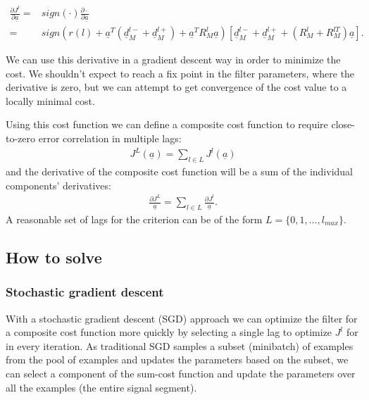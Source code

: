 \documentclass[journal,onecolumn]{IEEEtran}
\begin{document}
\begin{align*}
\frac{\partial J^l}{\partial \underline{a}} = & sign(\cdot)\frac{\partial \cdot}{\partial \underline{a}} \\
 = & sign\left( r(l) + \underline{a}^T\left( \underline{d}_M^{l-} + \underline{d}_M^{l+} \right) + \underline{a}^T R_M^l\underline{a} \right) \left[ \underline{d}_M^{l-} + \underline{d}_M^{l+} + \left( R_M^l + R_M^{lT} \right)\underline{a} \right].
\end{align*}

We can use this derivative in a gradient descent way in order to minimize the cost. We shouldn't expect to reach a fix point in the filter parameters, where the derivative is zero, but we can attempt to get convergence of the cost value to a locally minimal cost.

Using this cost function we can define a composite cost function to require close-to-zero error correlation in multiple lags:
\begin{align*}
J^{L}(\underline{a}) = \sum\limits_{l\in L}{J^l(\underline{a})}
\end{align*}
and the derivative of the composite cost function will be a sum of the individual components' derivatives:
\begin{align*}
\frac{\partial J^L}{\underline{a}} = \sum\limits_{l\in L}{\frac{\partial J^l}{\underline{a}}}.
\end{align*}
A reasonable set of lags for the criterion can be of the form $L = \{ 0,1,\ldots, l_{max} \}$.

\subsection{How to solve}
\subsubsection{Stochastic gradient descent}
With a stochastic gradient descent (SGD) approach we can optimize the filter for a composite cost function more quickly by selecting a single lag to optimize $J^l$ for in every iteration. As traditional SGD samples a subset (minibatch) of examples from the pool of examples and updates the parameters based on the subset, we can select a component of the sum-cost function and update the parameters over all the examples (the entire signal segment).
\end{document}
